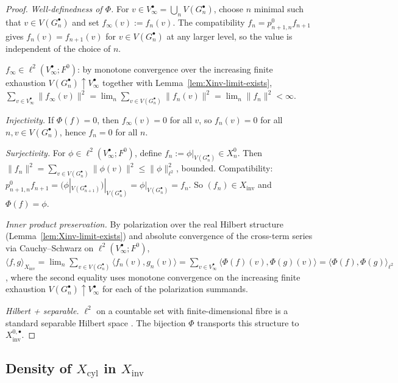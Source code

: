 \documentclass[11pt, a4paper]{amsart}
\theoremstyle{definition}
\newcommand{\inv}{\mathrm{inv}}
\newcommand{\cyl}{\mathrm{cyl}}
\begin{document}
\begin{proof}
\emph{Well-definedness of $\Phi$.} For $v \in V_\infty^\bullet =
\bigcup_n V(G_n^\bullet)$, choose $n$ minimal such that $v \in
V(G_n^\bullet)$ and set $f_\infty(v) := f_n(v)$. The compatibility
$f_n = p_{n+1, n}^0 f_{n+1}$ gives $f_n(v) = f_{n+1}(v)$ for
$v \in V(G_n^\bullet)$ at any larger level, so the value is
independent of the choice of $n$.

$f_\infty \in \ell^2(V_\infty^\bullet; F^0)$: by monotone
convergence over the increasing finite exhaustion
$V(G_n^\bullet) \uparrow V_\infty^\bullet$ together with
Lemma~\ref{lem:Xinv-limit-exists},
$\sum_{v \in V_\infty^\bullet} \|f_\infty(v)\|^2
= \lim_n \sum_{v \in V(G_n^\bullet)} \|f_n(v)\|^2
= \lim_n \|f_n\|^2 < \infty$.

\emph{Injectivity.} If $\Phi(f) = 0$, then $f_\infty(v) = 0$ for
all $v$, so $f_n(v) = 0$ for all $n, v \in V(G_n^\bullet)$, hence
$f_n = 0$ for all $n$.

\emph{Surjectivity.} For $\phi \in \ell^2(V_\infty^\bullet; F^0)$,
define $f_n := \phi|_{V(G_n^\bullet)} \in X_n^0$. Then
$\|f_n\|^2 = \sum_{v \in V(G_n^\bullet)} \|\phi(v)\|^2 \leq
\|\phi\|^2_{\ell^2}$, bounded. Compatibility: $p_{n+1, n}^0
f_{n+1} = (\phi|_{V(G_{n+1}^\bullet)})|_{V(G_n^\bullet)} =
\phi|_{V(G_n^\bullet)} = f_n$. So $(f_n) \in X_\inv$ and
$\Phi(f) = \phi$.

\emph{Inner product preservation.} By polarization over the real
Hilbert structure (Lemma~\ref{lem:Xinv-limit-exists}) and
absolute convergence of the cross-term series via Cauchy--Schwarz
on $\ell^2(V_\infty^\bullet; F^0)$,
$\langle f, g \rangle_{X_\inv} = \lim_n \sum_{v \in V(G_n^
\bullet)} \langle f_n(v), g_n(v) \rangle = \sum_{v \in V_\infty^
\bullet} \langle \Phi(f)(v), \Phi(g)(v) \rangle =
\langle \Phi(f), \Phi(g) \rangle_{\ell^2}$, where the second
equality uses monotone convergence on the increasing finite
exhaustion $V(G_n^\bullet) \uparrow V_\infty^\bullet$ for each
of the polarization summands.

\emph{Hilbert + separable.} $\ell^2$ on a countable set with
finite-dimensional fibre is a standard separable Hilbert space
\cite[Ch.~II.4]{ReedSimonI}. The bijection $\Phi$ transports
this structure to $X_\inv^{0, \bullet}$.
\end{proof}

\subsection{Density of $X_\cyl$ in $X_\inv$}
\end{document}
